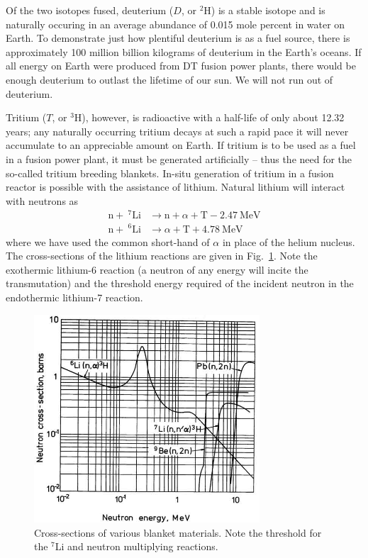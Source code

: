 Of the two isotopes fused, deuterium ($D$, or $^2$H) is a stable isotope and is naturally occuring in an average abundance of 0.015 mole percent in water on Earth. To demonstrate just how plentiful deuterium is as a fuel source, there is approximately 100 million billion kilograms of deuterium in the Earth's oceans. If all energy on Earth were produced from DT fusion power plants, there would be enough deuterium to outlast the lifetime of our sun. We will not run out of deuterium.  

Tritium ($T$, or $^3$H), however, is radioactive with a half-life of only about 12.32 years; any naturally occurring tritium decays at such a rapid pace it will never accumulate to an appreciable amount on Earth. If tritium is to be used as a fuel in a fusion power plant, it must be generated artificially -- thus the need for the so-called tritium breeding blankets. In-situ generation of tritium in a fusion reactor is possible with the assistance of lithium. Natural lithium will interact with neutrons as
\begin{subequations}\label{eq:lithium-t}
\begin{align}
	\mathrm{n} + \ ^7\mathrm{Li} &\xrightarrow \ \mathrm{n}+\alpha + \mathrm{T} -2.47\ \text{MeV}\label{eq:li7-t}\\
	\mathrm{n} + \ ^6\mathrm{Li} &\xrightarrow \  \alpha + \mathrm{T} +4.78\ \text{MeV} \label{eq:li6-t}
\end{align}
\end{subequations}
where we have used the common short-hand of $\alpha$ in place of the helium nucleus. The cross-sections of the lithium reactions are given in Fig.~\ref{fig:li-xsects}. Note the exothermic lithium-6 reaction (a neutron of any energy will incite the transmutation) and the threshold energy required of the incident neutron in the endothermic lithium-7 reaction.

\begin{figure}
	\centering
	\includegraphics[width=0.75\textwidth]{chapters/figures/breeding_xsecs} 
	\caption{Cross-sections of various blanket materials. Note the threshold for the $^7$Li and neutron multiplying reactions.}
	\label{fig:li-xsects}
\end{figure}


